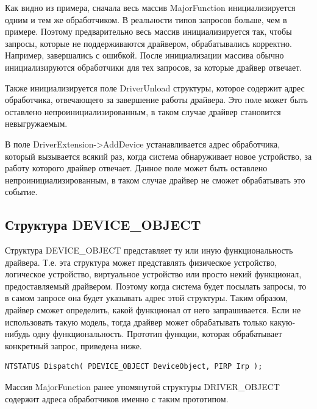 \documentclass[14pt,a4paper]{article}
\begin{document}
\par Как видно из примера, сначала весь массив MajorFunction инициализируется одним и тем же обработчиком. В реальности типов запросов больше, чем в примере. Поэтому предварительно весь массив инициализируется так, чтобы запросы, которые не поддерживаются драйвером, обрабатывались корректно. Например, завершались с ошибкой. После инициализации массива обычно инициализируются обработчики для тех запросов, за которые драйвер отвечает.\\

\par Также инициализируется поле DriverUnload структуры, которое содержит адрес обработчика, отвечающего за завершение работы драйвера. Это поле может быть оставлено непроинициализированным, в таком случае драйвер становится невыгружаемым.\\

\par В поле DriverExtension->AddDevice устанавливается адрес обработчика, который вызывается всякий раз, когда система обнаруживает новое устройство, за работу которого драйвер отвечает. Данное поле может быть оставлено непроинициализированным, в таком случае драйвер не сможет обрабатывать это событие. \\

\subsection{Структура DEVICE\_OBJECT}

Структура DEVICE\_OBJECT представляет ту или иную функциональность драйвера. Т.е. эта структура может представлять физическое устройство, логическое устройство, виртуальное устройство или просто некий функционал, предоставляемый драйвером. Поэтому когда система будет посылать запросы, то в самом запросе она будет указывать адрес этой структуры. Таким образом, драйвер сможет определить, какой функционал от него запрашивается. Если не использовать такую модель, тогда драйвер может обрабатывать только какую-нибудь одну функциональность. Прототип функции, которая обрабатывает конкретный запрос, приведена ниже.


\begin{lstlisting}[language=c caption={}]
NTSTATUS Dispatch( PDEVICE_OBJECT DeviceObject, PIRP Irp ); 
\end{lstlisting}

\par Массив MajorFunction ранее упомянутой структуры DRIVER\_OBJECT содержит адреса обработчиков именно с таким прототипом. \\
\end{document}
